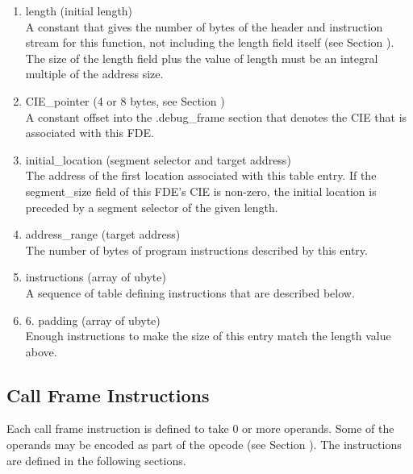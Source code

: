 \begin{enumerate}[1.]
\item length (initial length)  \\

A constant that gives the number of bytes of the header and
instruction stream for this function, not including the length
field itself 
(see Section  ). 
The size of the length field
plus the value of length must be an integral multiple of the
address size.

\item   CIE\_pointer (4 or 8 bytes, see Section ) \\
A constant offset into the .debug\_frame section that denotes
the CIE that is associated with this FDE.

\item  initial\_location (segment selector and target address) \\
The address of the first location associated with this table
entry. If the segment\_size field of this FDE's CIE is non-zero,
the initial location is preceded by a segment selector of
the given length.

\item  address\_range (target address) \\
The number of bytes of program instructions described by this entry.

\item instructions (array of ubyte) \\
A sequence of table defining instructions that are described below.

\item 6. padding (array of ubyte) \\
Enough  instructions to make the size of this
entry match the length value above.
\end{enumerate}

\subsection{Call Frame Instructions}
\label{chap:callframeinstructions}

Each call frame instruction is defined to take 0 or more
operands. Some of the operands may be encoded as part of the
opcode 
(see Section ). 
The instructions are defined in
the following sections.

